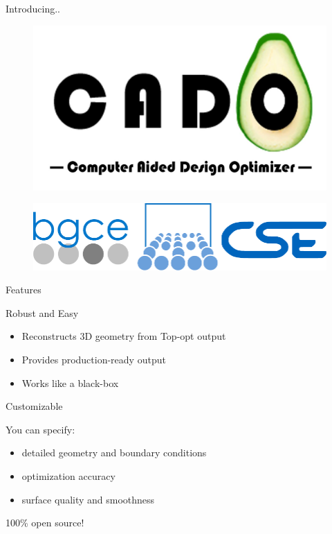 \begin{frame}{Introducing..}
	\begin{figure}
		\centering
		\includegraphics[scale=0.2]{Pictures/FirstHalf/cado_logo_text.jpg}
	\end{figure}
	\begin{figure}
		\centering
		\includegraphics[scale=0.35]{Pictures/FirstHalf/sccs_os2.pdf}
	\end{figure}
\end{frame}

\begin{frame}{Features}
	\begin{block}{Robust and Easy}{
			\begin{itemize}
				\item Reconstructs 3D geometry from Top-opt output
				\item Provides production-ready output
				\item Works like a black-box
			\end{itemize}
		}
	\end{block}
	\pause
	\begin{block}{Customizable}{
			You can specify:
			\begin{itemize}
				\item detailed geometry and boundary conditions
				\item optimization accuracy
				\item surface quality and smoothness
			\end{itemize}
		}
	\end{block}
	\pause
	\begin{block}{100\% open source!}{
		}
	\end{block}
\end{frame}

